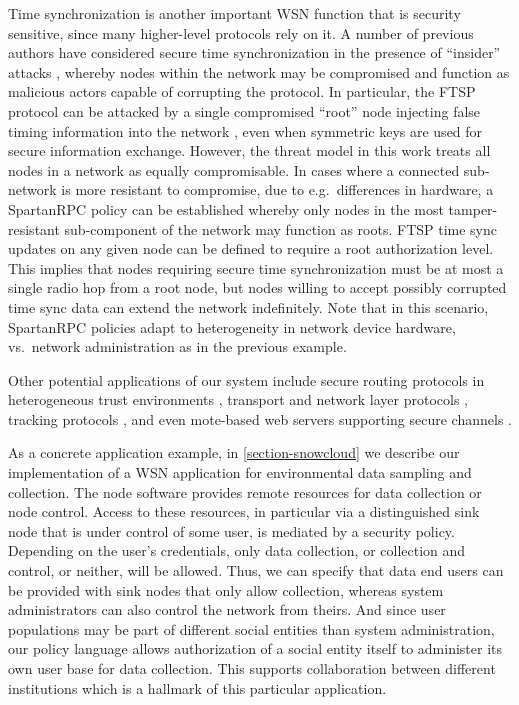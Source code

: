 Time synchronization is another important WSN function that is security
sensitive, since many higher-level protocols rely on it. A number of
previous authors have considered secure time synchronization in the
presence of ``insider'' attacks
\cite{Manzo:2005:TSA:1102219.1102238,Ganeriwal:2008:STS:1380564.1380571},
whereby nodes within the network may be compromised and function as
malicious actors capable of corrupting the protocol. In particular, the
FTSP protocol can be attacked by a single compromised ``root'' node
injecting false timing information into the network
\cite{Manzo:2005:TSA:1102219.1102238}, even when symmetric keys are used
for secure information exchange. However, the threat model in this work
treats all nodes in a network as equally compromisable. In cases where a
connected sub-network is more resistant to compromise, due to
e.g.~differences in hardware, a SpartanRPC policy can be established
whereby only nodes in the most tamper-resistant sub-component of the
network may function as roots. FTSP time sync updates on any given node
can be defined to require a root authorization level. This implies that
nodes requiring secure time synchronization must be at most a single
radio hop from a root node, but nodes willing to accept possibly
corrupted time sync data can extend the network indefinitely. Note that
in this scenario, SpartanRPC policies adapt to heterogeneity in network
device hardware, vs.~network administration as in the previous example.

Other potential applications of our system include secure routing
protocols in heterogeneous trust environments \cite{senroute-ahnj03},
transport and network layer protocols \cite{perillo-heinzelman-2005},
tracking protocols \cite{brooks-ramanathan-sayeed-2003}, and even
mote-based web servers supporting secure channels \cite{1049776}.  

As a concrete application example, in \autoref{section-snowcloud} we
describe our implementation of a WSN application for environmental data
sampling and collection. The node software provides remote resources for
data collection or node control. Access to these resources, in
particular via a distinguished sink node that is under control of some
user, is mediated by a security policy. Depending on the user's
credentials, only data collection, or collection and control, or
neither, will be allowed. Thus, we can specify that data end users can
be provided with sink nodes that only allow collection, whereas system
administrators can also control the network from theirs. And since user
populations may be part of different social entities than system
administration, our policy language allows authorization of a social
entity itself to administer its own user base for data collection. This
supports collaboration between different institutions which is a
hallmark of this particular application.


